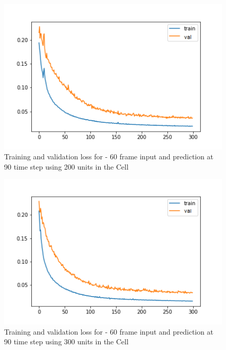 \begin{figure}[H] 
\includegraphics[scale=0.7]{conf15_300e_60_90ffuture_200unit}
\begin{center}
\caption{Training and validation loss for - 60 frame input and prediction at 90 time step using 200 units in the Cell}
\label{60-90-200unit}
\end{center}
\end{figure}

\begin{figure}[H] 
\includegraphics[scale=0.7]{conf16_300e_60_90ffuture_300unit}
\begin{center}
\caption{Training and validation loss for - 60 frame input and prediction at 90 time step using 300 units in the
 Cell}
\label{60-90-300unit}
\end{center}
\end{figure}

